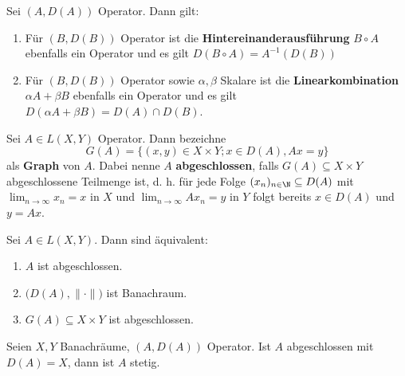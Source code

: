 \begin{bem}\label{Eigenschaften der Verknüpfung von Operatoren}
Sei $(A,D(A))$ Operator. Dann gilt:
\begin{enumerate}
\item Für $(B,D(B))$ Operator  ist die \textbf{Hintereinanderausführung} $B\circ A$ ebenfalls ein Operator und es gilt $D(B\circ A)=A^{-1}(D(B))$
\item Für $(B,D(B))$ Operator  sowie $\alpha, \beta$ Skalare ist die \textbf{Linearkombination} $\alpha A + \beta B$ ebenfalls ein Operator und es gilt $D(\alpha A + \beta B)=D(A)\cap D(B)$.
\end{enumerate}
\end{bem}

\begin{defi}
Sei $A\in L(X,Y)$ Operator. Dann bezeichne 
\begin{equation}\label{eq:}
G(A)=\{(x,y)\in X\times Y; x\in D(A), Ax= y\}
\end{equation}
als \textbf{Graph} von $A$. Dabei nenne $A$ \textbf{abgeschlossen}, falls $G(A)\subseteq X\times Y$ abgeschlossene Teilmenge ist, d. h. für jede Folge $(x_n)_{n\in\N}\subseteq D(A)$ mit $\lim_{n\to\infty} x_n = x$ in $X$ und $\lim_{n\to\infty} Ax_n = y$ in $Y$ folgt bereits $x\in D(A)$ und $y= Ax$.
\end{defi}

\begin{prop}\cite{banasiak_arlotti_2006}\label{Charakterisierung der Abgeschlossenheit von Operatoren}
Sei $A\in L(X,Y)$. Dann sind äquivalent:
\begin{enumerate}
\item $A$ ist abgeschlossen.
\item $\big(D(A),\|\cdot\|\big)$ ist Banachraum.
\item $G(A)\subseteq X\times Y$ ist abgeschlossen.
\end{enumerate}
\end{prop}

\begin{prop}\cite{}\label{Satz vom abgeschlossenen Graphen}
Seien $X, Y$ Banachräume, $(A,D(A))$ Operator. Ist $A$ abgeschlossen mit $D(A)=X$, dann ist $A$ stetig.
\end{prop}


